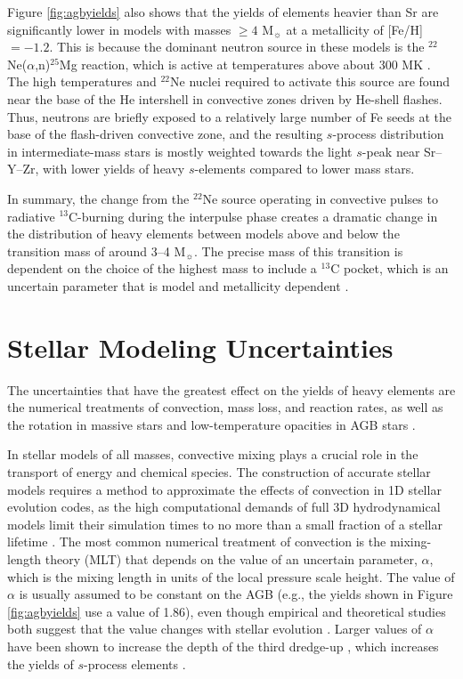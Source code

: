 Figure \ref{fig:agbyields} also shows that the yields of elements heavier than Sr are significantly lower in models with masses $\geq 4$ M$_\sun$ at a metallicity of [Fe/H]$=-1.2$. This is because the dominant neutron source in these models is the $^{22}$Ne($\alpha$,n)$^{25}$Mg reaction, which is active at temperatures above about 300 MK \citep{Cameron:1960hj,Iben:1975bn,Goriely:2000vs}. The high temperatures and $^{22}$Ne nuclei required to activate this source are found near the base of the He intershell in convective zones driven by He-shell flashes. Thus, neutrons are briefly exposed to a relatively large number of Fe seeds at the base of the flash-driven convective zone, and the resulting $s$-process distribution in intermediate-mass stars is mostly weighted towards the light $s$-peak near Sr--Y--Zr, with lower yields of heavy $s$-elements compared to lower mass stars.

In summary, the change from the $^{22}$Ne source operating in convective pulses to radiative $^{13}$C-burning during the interpulse phase creates a dramatic change in the distribution of heavy elements between models above and below the transition mass of around 3--4 M$_\sun$. The precise mass of this transition is dependent on the choice of the highest mass to include a $^{13}$C pocket, which is an uncertain parameter that is model and metallicity dependent \citep{Goriely:2004gw,Herwig:2004ki}.

\section{Stellar Modeling Uncertainties}\label{sec:modeluncertainties}
The uncertainties that have the greatest effect on the yields of heavy elements are the numerical treatments of convection, mass loss, and reaction rates, as well as the rotation in massive stars and low-temperature opacities in AGB stars \citep[e.g.,][]{Marigo:2002cu, Fishlock:2014hn,Constantino:2014gv}.

In stellar models of all masses, convective mixing plays a crucial role in the transport of energy and chemical species. The construction of accurate stellar models requires a method to approximate the effects of convection in 1D stellar evolution codes, as the high computational demands of full 3D hydrodynamical models limit their simulation times to no more than a small fraction of a stellar lifetime \citep[e.g.,][]{Stancliffe:2011dw}. The most common numerical treatment of convection is the mixing-length theory (MLT) that depends on the value of an uncertain parameter, $\alpha$, which is the mixing length in units of the local pressure scale height. The value of $\alpha$ is usually assumed to be constant on the AGB (e.g., the yields shown in Figure \ref{fig:agbyields} use a value of 1.86), even though empirical and theoretical studies both suggest that the value changes with stellar evolution \citep{Lebzelter:2007ho,Magic:2014vb}. Larger values of $\alpha$ have been shown to increase the depth of the third dredge-up \citep{Boothroyd:1988jl}, which increases the yields of $s$-process elements \citep{Cristallo:2009kn,Cristallo:2011fz}.

